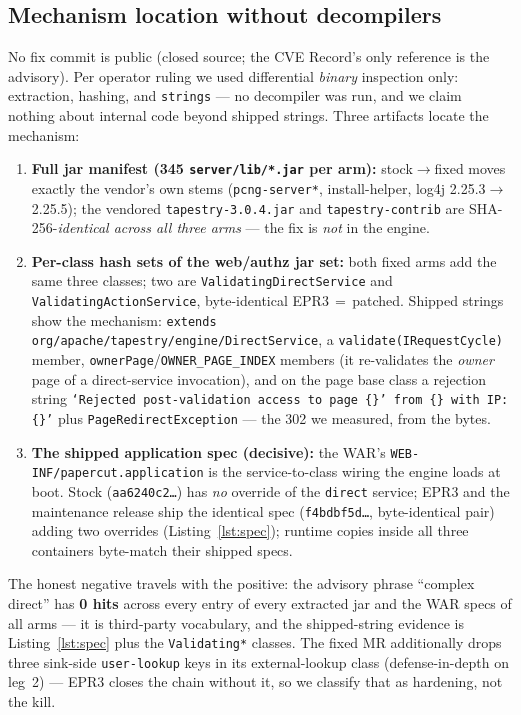 \documentclass[journal]{IEEEtran}
\begin{document}
\subsection{Mechanism location without decompilers}
\label{sec:fixmech}
No fix commit is public (closed source; the CVE Record's only reference is the
advisory). Per operator ruling we used differential \emph{binary} inspection
only: extraction, hashing, and \texttt{strings} — no decompiler was run, and we
claim nothing about internal code beyond shipped strings. Three artifacts
locate the mechanism:
\begin{enumerate}
\item \textbf{Full jar manifest (345 \texttt{server/lib/*.jar} per arm):}
stock$\rightarrow$fixed moves exactly the vendor's own stems
(\texttt{pcng-server*}, install-helper, log4j 2.25.3$\rightarrow$2.25.5); the
vendored \texttt{tapestry-3.0.4.jar} and \texttt{tapestry-contrib} are
SHA-256-\emph{identical across all three arms} — the fix is \emph{not} in the
engine.
\item \textbf{Per-class hash sets of the web/authz jar set:} both fixed arms
add the same three classes; two are \texttt{ValidatingDirectService} and
\texttt{ValidatingActionService}, byte-identical EPR3\,$=\,$patched. Shipped
strings show the mechanism:
{\scriptsize\texttt{extends org/apache/\allowbreak tapestry/engine/\allowbreak DirectService}}, a
\texttt{validate(IRequestCycle)}
member, \texttt{ownerPage}/\allowbreak\texttt{OWNER\_PAGE\_INDEX} members (it
re-validates the \emph{owner} page of a direct-service invocation), and on the
page base class a rejection string \texttt{`Rejected post-validation access to
page \{\}' from \{\} with IP: \{\}'} plus \texttt{PageRedirectException} — the
302 we measured, from the bytes.
\item \textbf{The shipped application spec (decisive):} the WAR's
\texttt{WEB-INF/papercut.application} is the service-to-class wiring the engine
loads at boot. Stock (\texttt{aa6240c2\ldots}) has \emph{no} override of the
\texttt{direct} service; EPR3 and the maintenance release ship the identical
spec (\texttt{f4bdbf5d\ldots}, byte-identical pair) adding two overrides
(Listing~\ref{lst:spec}); runtime copies inside all three containers
byte-match their shipped specs.
\end{enumerate}
The honest negative travels with the positive: the advisory phrase ``complex
direct'' has \textbf{0 hits} across every entry of every extracted jar and the
WAR specs of all arms — it is third-party vocabulary, and the shipped-string
evidence is Listing~\ref{lst:spec} plus the \texttt{Validating*} classes.
The fixed MR additionally drops three sink-side \texttt{user-lookup} keys in
its external-lookup class (defense-in-depth on leg~2) — EPR3 closes the chain
without it, so we classify that as hardening, not the kill.
\end{document}
